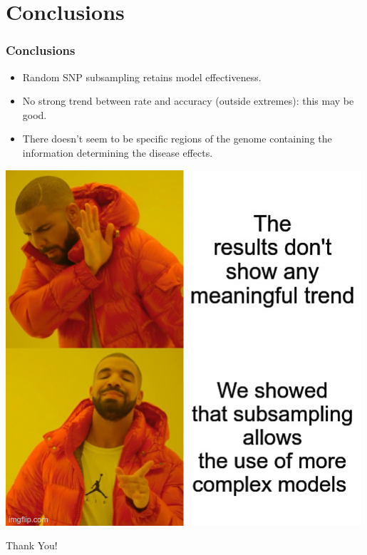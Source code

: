 \documentclass[aspectratio=169]{beamer}
\begin{document}
\section{Conclusions}
\begin{frame}
\frametitle{Conclusions}
\begin{minipage}{0.60\textwidth}
\begin{itemize}
  \item Random SNP subsampling retains model effectiveness.
  \item No strong trend between rate and accuracy (outside extremes): this may be good.
  \item There doesn't seem to be specific regions of the genome containing the information determining the disease effects.
\end{itemize}
\end{minipage}
\begin{minipage}{0.35\textwidth}
    \includegraphics[width=0.99\textwidth]{memes/drake_results.jpg}
\end{minipage}
\end{frame}

\begin{emptyframe}
\centering
\Huge Thank You!
\end{emptyframe}
\end{document}
